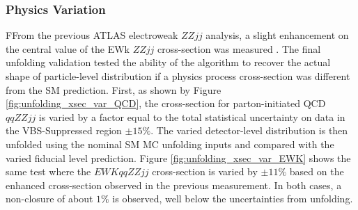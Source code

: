 \subsubsection{Physics Variation}
FFrom the previous ATLAS electroweak $ZZjj$ analysis, a slight enhancement on the central value of the EWk $ZZjj$ cross-section was measured \cite{ATLASZZjj}. The final unfolding validation tested the ability of the algorithm to recover the actual shape of particle-level distribution if a physics process cross-section was different from the SM prediction. First, as shown by Figure \ref{fig:unfolding_xsec_var_QCD}, the cross-section for parton-initiated QCD $qqZZjj$ is varied by a factor equal to the total statistical uncertainty on data in the VBS-Suppressed region $\pm  15\%$. The varied detector-level distribution is then unfolded using the nominal SM MC unfolding inputs and compared with the varied fiducial level prediction. Figure \ref{fig:unfolding_xsec_var_EWK} shows the same test where the $EWK qqZZjj$ cross-section is varied by $\pm 11\%$ based on the enhanced cross-section observed in the previous measurement. In both cases, a non-closure of about $1\%$ is observed, well below the uncertainties from unfolding.

